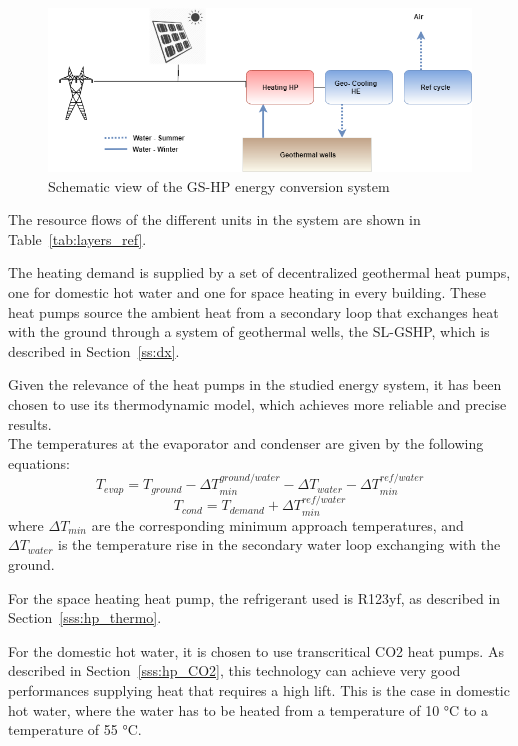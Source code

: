\documentclass{article}
\begin{document}
\begin{figure}[tph]
	\centering
	\includegraphics[width=1\linewidth]{Images/energy_schema_ref}
	\caption{Schematic view of the GS-HP energy conversion system}
	\label{fig:energyschemaref}
\end{figure}

The resource flows of the different units in the system are shown in Table~\ref{tab:layers_ref}.




The heating demand is supplied by a set of decentralized geothermal heat pumps, one for domestic hot water and one for space heating in every building. These heat pumps source the ambient heat from a secondary loop that exchanges heat with the ground through a system of geothermal wells, the SL-GSHP, which is described in Section~\ref{ss:dx}. 

Given the relevance of the heat pumps in the studied energy system, it has been chosen to use its thermodynamic model, which achieves more reliable and precise results.\\

The temperatures at the evaporator and condenser are given by the following equations:
\begin{equation}
    T_{evap} = T_{ground} - \Delta T_{min}^{ground/water} - \Delta T_{water} - \Delta T_{min}^{ref/water}
\end{equation}
\begin{equation}
    T_{cond} = T_{demand} + \Delta T_{min}^{ref/water}
\end{equation}
where $\Delta T_{min}$ are the corresponding minimum approach temperatures, and $\Delta T_{water}$ is the temperature rise in the secondary water loop exchanging with the ground.

For the space heating heat pump, the refrigerant used is R123yf, as described in Section~\ref{sss:hp_thermo}.

For the domestic hot water, it is chosen to use transcritical CO2 heat pumps. As described in Section~\ref{sss:hp_CO2}, this technology can achieve very good performances supplying heat that requires a high lift. This is the case in domestic hot water, where the water has to be heated from a temperature of 10 \si{\celsius} to a temperature of 55 \si{\celsius}.\\
\end{document}
